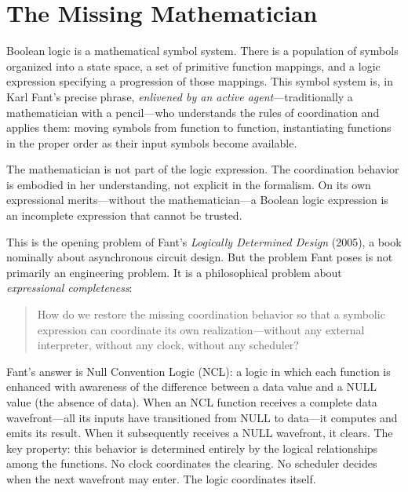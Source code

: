 \documentclass[12pt, a4paper]{article}
\begin{document}
\vspace{1.0em}
\tableofcontents
\newpage

\section{The Missing Mathematician}

Boolean logic is a mathematical symbol system. There is a population of
symbols organized into a state space, a set of primitive function
mappings, and a logic expression specifying a progression of those
mappings. This symbol system is, in Karl Fant's precise phrase,
\emph{enlivened by an active agent}---traditionally a mathematician
with a pencil---who understands the rules of coordination and applies
them: moving symbols from function to function, instantiating functions
in the proper order as their input symbols become available.

The mathematician is not part of the logic expression. The coordination
behavior is embodied in her understanding, not explicit in the formalism.
On its own expressional merits---without the mathematician---a Boolean
logic expression is an incomplete expression that cannot be trusted.

This is the opening problem of Fant's \textit{Logically Determined Design}
(2005), a book nominally about asynchronous circuit design. But the
problem Fant poses is not primarily an engineering problem. It is a
philosophical problem about \emph{expressional completeness}:

\begin{quote}
How do we restore the missing coordination behavior so that a symbolic
expression can coordinate its own realization---without any external
interpreter, without any clock, without any scheduler?
\end{quote}

Fant's answer is Null Convention Logic (NCL): a logic in which each
function is enhanced with awareness of the difference between a data
value and a NULL value (the absence of data). When an NCL function
receives a complete data wavefront---all its inputs have transitioned
from NULL to data---it computes and emits its result. When it
subsequently receives a NULL wavefront, it clears. The key property:
this behavior is determined entirely by the logical relationships among
the functions. No clock coordinates the clearing. No scheduler decides
when the next wavefront may enter. The logic coordinates itself.
\end{document}
